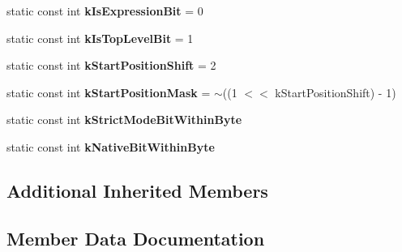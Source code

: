 \begin{DoxyCompactItemize}
\item 
\hypertarget{classv8_1_1internal_1_1_shared_function_info_a43ab375cccd459b58fe5df20af29373f}{}static const int {\bfseries k\+Is\+Expression\+Bit} = 0\label{classv8_1_1internal_1_1_shared_function_info_a43ab375cccd459b58fe5df20af29373f}

\item 
\hypertarget{classv8_1_1internal_1_1_shared_function_info_adc95d1c6bf25ede4b1a93ce81b8e4178}{}static const int {\bfseries k\+Is\+Top\+Level\+Bit} = 1\label{classv8_1_1internal_1_1_shared_function_info_adc95d1c6bf25ede4b1a93ce81b8e4178}

\item 
\hypertarget{classv8_1_1internal_1_1_shared_function_info_a1bbfd2d3800f2f9d0e163ec6853a5ddc}{}static const int {\bfseries k\+Start\+Position\+Shift} = 2\label{classv8_1_1internal_1_1_shared_function_info_a1bbfd2d3800f2f9d0e163ec6853a5ddc}

\item 
\hypertarget{classv8_1_1internal_1_1_shared_function_info_a842d691f3494ecaa2240bfb45b1f7260}{}static const int {\bfseries k\+Start\+Position\+Mask} = $\sim$((1 $<$$<$ k\+Start\+Position\+Shift) -\/ 1)\label{classv8_1_1internal_1_1_shared_function_info_a842d691f3494ecaa2240bfb45b1f7260}

\item 
static const int {\bfseries k\+Strict\+Mode\+Bit\+Within\+Byte}
\item 
static const int {\bfseries k\+Native\+Bit\+Within\+Byte}
\end{DoxyCompactItemize}
\subsection*{Additional Inherited Members}


\subsection{Member Data Documentation}
\hypertarget{classv8_1_1internal_1_1_shared_function_info_a51f5c186495c39310685bbb6b8d96176}{}
